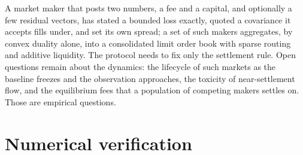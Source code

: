 \documentclass[11pt]{article}
\theoremstyle{definition}
\theoremstyle{remark}
\begin{document}
A market maker that posts two numbers, a fee and a capital, and optionally a few residual vectors, has stated a
bounded loss exactly, quoted a covariance it accepts fills under, and set its own spread; a set of such makers aggregates, by
convex duality alone, into a consolidated limit order book with sparse routing and additive liquidity. The
protocol needs to fix only the settlement rule. Open questions remain about the dynamics: the lifecycle of such
markets as the baseline freezes and the observation approaches, the toxicity of near-settlement flow, and the
equilibrium fees that a population of competing makers settles on. Those are empirical questions.




\appendix
\section{Numerical verification}\label{app:verify}
\end{document}
